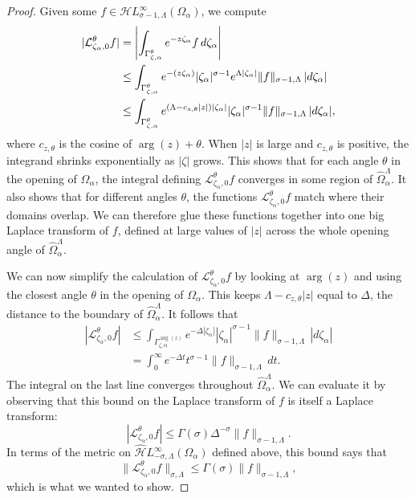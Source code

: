 \documentclass{article}
\let\Re\relax
\DeclareMathOperator{\Re}{Re}
\newcommand{\singexp}[2]{\mathcal{H}L^\infty_{#1, #2}}
\newcommand{\dualsingexp}[2]{\widehat{\mathcal{H}}L^\infty_{#1, #2}}
\newcommand{\laplace}{\mathcal{L}}
\theoremstyle{definition}
\theoremstyle{plain}
\begin{document}
\begin{proof}
Given some $f \in \singexp{\sigma-1}{\Lambda}(\Omega_\alpha)$, we compute
\begin{align*}
|\laplace_{\zeta_\alpha, 0}^\theta f| & = \left| \int_{\Gamma_{\zeta, \alpha}^\theta} e^{-z\zeta_\alpha} f\,d\zeta_\alpha \right| \\
& \le \int_{\Gamma_{\zeta, \alpha}^\theta} e^{-\Re(z\zeta_\alpha)} |\zeta_\alpha|^{\sigma-1} e^{\Lambda |\zeta_\alpha|} \|f\|_{\sigma-1, \Lambda}\,|d\zeta_\alpha| \\
& \le \int_{\Gamma_{\zeta, \alpha}^\theta} e^{(\Lambda - c_{z, \theta}|z|)|\zeta_\alpha|} |\zeta_\alpha|^{\sigma-1} \|f\|_{\sigma-1, \Lambda}\,|d\zeta_\alpha|,
\end{align*}
where $c_{z, \theta}$ is the cosine of $\arg(z) + \theta$. When $|z|$ is large and $c_{z, \theta}$ is positive, the integrand shrinks exponentially as $|\zeta|$ grows. This shows that for each angle $\theta$ in the opening of $\Omega_\alpha$, the integral defining $\laplace_{\zeta_\alpha, 0}^\theta f$ converges in some region of $\widehat{\Omega}_\alpha^\Lambda$. It also shows that for different angles $\theta$, the functions $\laplace_{\zeta_\alpha, 0}^\theta f$ match where their domains overlap. We can therefore glue these functions together into one big Laplace transform of $f$, defined at large values of $|z|$ across the whole opening angle of $\widehat{\Omega}_\alpha^\Lambda$.

We can now simplify the calculation of $\laplace_{\zeta_\alpha, 0}^\theta f$ by looking at $\arg(z)$ and using the closest angle $\theta$ in the opening of $\Omega_\alpha$. This keeps $\Lambda - c_{z, \theta}|z|$ equal to $\Delta$, the distance to the boundary of $\widehat{\Omega}_\alpha^\Lambda$. It follows that
\begin{align*}
|\laplace_{\zeta_\alpha, 0}^\theta f| & \le \int_{\Gamma_{\zeta, \alpha}^{\arg(z)}} e^{-\Delta|\zeta_\alpha|} |\zeta_\alpha|^{\sigma-1} \|f\|_{\sigma-1, \Lambda}\,|d\zeta_\alpha| \\
& = \int_0^\infty e^{-\Delta t} t^{\sigma-1} \|f\|_{\sigma-1, \Lambda}\,dt.
\end{align*}
The integral on the last line converges throughout $\widehat{\Omega}_\alpha^\Lambda$. We can evaluate it by observing that this bound on the Laplace transform of $f$ is itself a Laplace transform:
\[ |\laplace_{\zeta_\alpha, 0}^\theta f| \le \Gamma(\sigma) \Delta^{-\sigma} \|f\|_{\sigma-1, \Lambda}. \]
In terms of the metric on $\dualsingexp{-\sigma}{\Lambda}(\Omega_\alpha)$ defined above, this bound says that
\[ \|\laplace_{\zeta_\alpha, 0}^\theta f\|_{\sigma, \Lambda} \le \Gamma(\sigma) \|f\|_{\sigma-1, \Lambda}, \]
which is what we wanted to show.
\end{proof}
\end{document}
